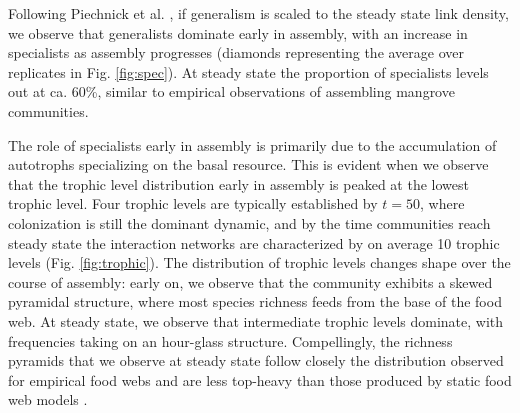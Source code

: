 \documentclass[9pt,twocolumn,twoside]{pnas-new}
\newcommand{\rr}[1]{{\rm #1}}
\begin{document}
Following Piechnick et al. \cite{Piechnik2008}, if generalism is scaled to the steady state link density, we observe that generalists dominate early in assembly, with an increase in specialists as assembly progresses (diamonds representing the average over replicates in Fig. \ref{fig:spec}).
At steady state the proportion of specialists levels out at ca. 60\%, similar to empirical observations of assembling mangrove communities.


The role of specialists early in assembly is primarily due to the accumulation of autotrophs specializing on the basal resource.
This is evident when we observe that the trophic level distribution early in assembly is peaked at the lowest trophic level.
Four trophic levels are typically established by $t=50$, where colonization is still the dominant dynamic, and by the time communities reach steady state the interaction networks are characterized by on average 10 trophic levels (Fig. \ref{fig:trophic}).
The distribution of trophic levels changes shape over the course of assembly: early on, we observe that the community exhibits a skewed pyramidal structure, where most species richness feeds from the base of the food web.
At steady state, we observe that intermediate trophic levels dominate, with frequencies taking on an hour-glass structure.
Compellingly, the richness pyramids that we observe at steady state follow closely the distribution observed for empirical food webs and are less top-heavy than those produced by static food web models \cite{Turney2016}.\\
\end{document}
